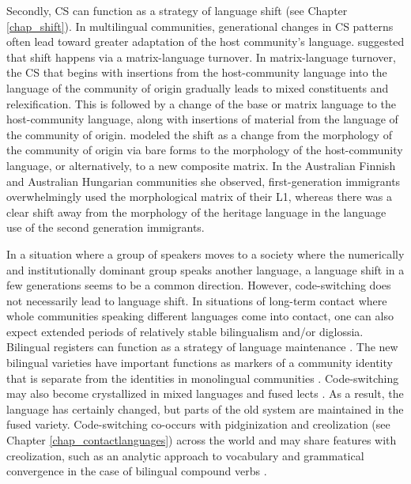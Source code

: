 \documentclass[output=paper]{langscibook}
\begin{document}
Secondly, CS can function as a strategy of language shift (see Chapter \ref{chap_shift}). In multilingual communities, generational changes in CS patterns often lead toward greater adaptation of the host community's language. \textcite[208--228]{myers1997duelling} suggested that shift happens via a matrix-language turnover. In matrix-language turnover, the CS that begins with insertions from the host-community language into the language of the community of origin gradually leads to mixed constituents and relexification. This is followed by a change of the base or matrix language to the host-community language, along with insertions of material from the language of the community of origin. \textcite{kovacs2001code} modeled the shift as a change from the morphology of the community of origin via bare forms to the morphology of the host-community language, or alternatively, to a new composite matrix. In the Australian Finnish and Australian Hungarian communities she observed, first-generation immigrants overwhelmingly used the morphological matrix of their L1, whereas there was a clear shift away from the morphology of the heritage language in the language use of the second generation immigrants.

In a situation where a group of speakers moves to a society where the numerically and institutionally dominant group speaks another language, a language shift in a few generations seems to be a common direction. However, code-switching does not necessarily lead to language shift. In situations of long-term contact where whole communities speaking different languages come into contact, one can also expect extended periods of relatively stable bilingualism and/or diglossia. Bilingual registers can function as a strategy of language maintenance \parencite{lantto2015code,lantto2016conversations}. The new bilingual varieties have important functions as markers of a community identity that is separate from the identities in monolingual communities \parencites[62]{gumperz1982discourse}[197]{thomason2001contact}[10]{bullock2009cambridge}. Code-switching may also become crystallized in mixed languages and fused lects \parencite{auer1999codeswitching,mcconvell2005gurindji,meakins2011case}. As a result, the language has certainly changed, but parts of the old system are maintained in the fused variety. Code-switching co-occurs with pidginization and creolization (see Chapter \ref{chap_contactlanguages}) across the world and may share features with creolization, such as an analytic approach to vocabulary and grammatical convergence in the case of bilingual compound verbs \parencite[33--35]{gardner2009code}.
\end{document}
